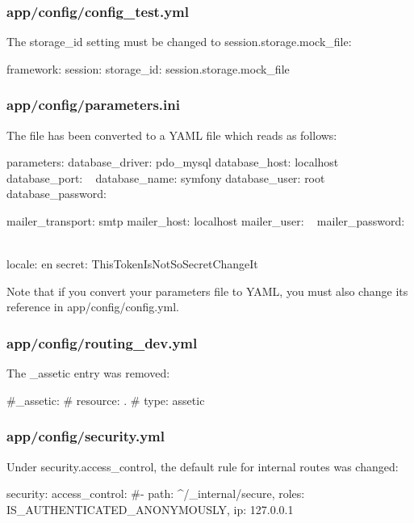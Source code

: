 \subsubsection*{{\ttfamily app/config/config\+\_\+test.\+yml}}

The {\ttfamily storage\+\_\+id} setting must be changed to {\ttfamily session.\+storage.\+mock\+\_\+file}\+: \begin{DoxyVerb}framework:
    session:
        storage_id: session.storage.mock_file
\end{DoxyVerb}


\subsubsection*{{\ttfamily app/config/parameters.\+ini}}

The file has been converted to a Y\+A\+M\+L file which reads as follows\+: \begin{DoxyVerb}parameters:
    database_driver:   pdo_mysql
    database_host:     localhost
    database_port:     ~
    database_name:     symfony
    database_user:     root
    database_password: ~

    mailer_transport:  smtp
    mailer_host:       localhost
    mailer_user:       ~
    mailer_password:   ~

    locale:            en
    secret:            ThisTokenIsNotSoSecretChangeIt
\end{DoxyVerb}


Note that if you convert your parameters file to Y\+A\+M\+L, you must also change its reference in {\ttfamily app/config/config.\+yml}.

\subsubsection*{{\ttfamily app/config/routing\+\_\+dev.\+yml}}

The {\ttfamily \+\_\+assetic} entry was removed\+: \begin{DoxyVerb}#_assetic:
#    resource: .
#    type:     assetic
\end{DoxyVerb}


\subsubsection*{{\ttfamily app/config/security.\+yml}}

Under {\ttfamily security.\+access\+\_\+control}, the default rule for internal routes was changed\+: \begin{DoxyVerb}security:
    access_control:
        #- { path: ^/_internal/secure, roles: IS_AUTHENTICATED_ANONYMOUSLY, ip: 127.0.0.1 }
\end{DoxyVerb}


